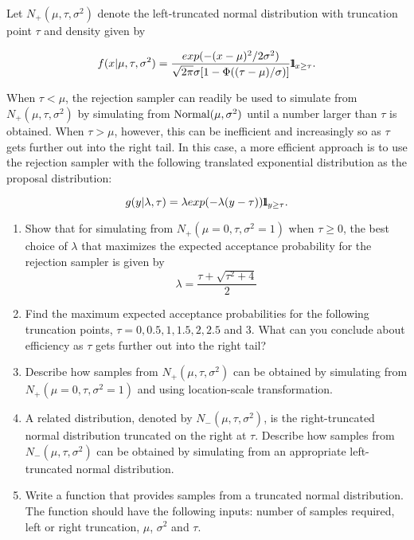 \begin{labwork}
Let $N_+(\mu,\tau,\sigma^2)$ denote the left-truncated normal distribution with truncation point $\tau$ and density given by

$$f(x|\mu,\tau,\sigma^2)=\frac{exp(-(x-\mu)^2/2\sigma^2)}{\sqrt{2\pi}\sigma[1-\Phi((\tau-\mu)/\sigma)]}{1}\mspace{-11 mu}{1}_{x\geq\tau}.$$

When $\tau<\mu$, the rejection sampler can readily be used to simulate from $N_+(\mu,\tau,\sigma^2)$ by simulating from $\mbox{{\rm Normal}}(\mu,\sigma^2)$ until a number larger than $\tau$ is obtained. When $\tau>\mu$, however, this can be inefficient and increasingly so as $\tau$ gets further out into the right tail. In this case, a more efficient approach is to use the rejection sampler with the following translated exponential distribution as the proposal distribution:

$$g(y|\lambda,\tau)={\lambda}exp(-\lambda(y-\tau)){1}\mspace{-11 mu}{1}_{y\geq\tau}.$$

\begin{enumerate}
\item Show that for simulating from $N_+(\mu=0,\tau,\sigma^2=1)$ when $\tau\geq0$, the best choice of $\lambda$ that maximizes the expected acceptance probability for the rejection sampler is given by
$$\lambda=\frac{\tau+\sqrt{\tau^2+4}}{2}$$
\item Find the maximum expected acceptance probabilities for the following truncation points, $\tau=0,0.5,1,1.5,2,2.5$ and 3. What can you conclude about efficiency as $\tau$ gets further out into the right tail?
\item Describe how samples from $N_+(\mu,\tau,\sigma^2)$ can be obtained by simulating from $N_+(\mu=0,\tau,\sigma^2=1)$ and using location-scale transformation.
\item A related distribution, denoted by $N_-(\mu,\tau,\sigma^2)$, is the right-truncated normal distribution truncated on the right at $\tau$. Describe how samples from $N_-(\mu,\tau,\sigma^2)$ can be obtained by simulating from an appropriate left-truncated normal distribution.
\item Write a \Matlab function that provides samples from a truncated normal distribution. The function should have the following inputs: number of samples required, left or right truncation, $\mu$, $\sigma^2$ and $\tau$.
\end{enumerate}
\end{labwork}



